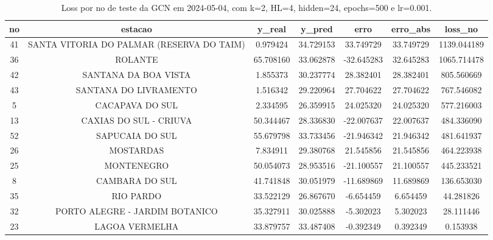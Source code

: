 \begin{table}[h]
\centering
\caption{Loss por no de teste da GCN em 2024-05-04, com k=2, HL=4, hidden=24, epochs=500 e lr=0.001.}
\label{tab:gcn_loss_k2_hl4_h24_e500_d20240504}
\begin{tabular}{ccccccc}
\toprule
no & estacao & y\_real & y\_pred & erro & erro\_abs & loss\_no \\
\midrule
41 & SANTA VITORIA DO PALMAR (RESERVA DO TAIM) & 0.979424 & 34.729153 & 33.749729 & 33.749729 & 1139.044189 \\
36 & ROLANTE & 65.708160 & 33.062878 & -32.645283 & 32.645283 & 1065.714478 \\
42 & SANTANA DA BOA VISTA & 1.855373 & 30.237774 & 28.382401 & 28.382401 & 805.560669 \\
43 & SANTANA DO LIVRAMENTO & 1.516342 & 29.220964 & 27.704622 & 27.704622 & 767.546082 \\
5 & CACAPAVA DO SUL & 2.334595 & 26.359915 & 24.025320 & 24.025320 & 577.216003 \\
13 & CAXIAS DO SUL - CRIUVA & 50.344467 & 28.336830 & -22.007637 & 22.007637 & 484.336090 \\
52 & SAPUCAIA DO SUL & 55.679798 & 33.733456 & -21.946342 & 21.946342 & 481.641937 \\
26 & MOSTARDAS & 7.834911 & 29.380768 & 21.545856 & 21.545856 & 464.223938 \\
25 & MONTENEGRO & 50.054073 & 28.953516 & -21.100557 & 21.100557 & 445.233521 \\
8 & CAMBARA DO SUL & 41.741848 & 30.051979 & -11.689869 & 11.689869 & 136.653030 \\
35 & RIO PARDO & 33.522129 & 26.867670 & -6.654459 & 6.654459 & 44.281826 \\
32 & PORTO ALEGRE - JARDIM BOTANICO & 35.327911 & 30.025888 & -5.302023 & 5.302023 & 28.111446 \\
23 & LAGOA VERMELHA & 33.879757 & 33.487408 & -0.392349 & 0.392349 & 0.153938 \\
\bottomrule
\end{tabular}
\end{table}
